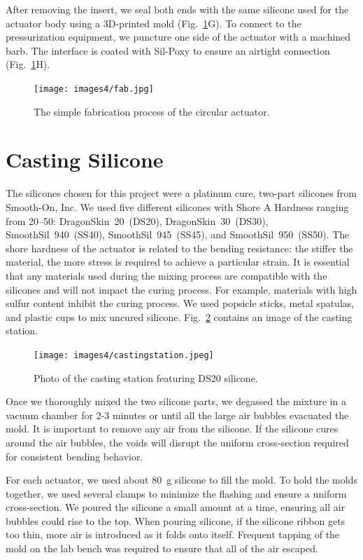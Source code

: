 After removing the insert, we seal both ends with the same silicone used for the actuator body using a 3D-printed mold (Fig.~\ref{figure:fab}G). To connect to the pressurization equipment, we puncture one side of the actuator with a machined barb. The interface is coated with Sil-Poxy to ensure an airtight connection (Fig.~\ref{figure:fab}H).

\begin{figure}[ht!]
    \centering
     \texttt{[image: images4/fab.jpg]}
    \caption{The simple fabrication process of the circular actuator.}
    \label{figure:fab}
\end{figure}

\clearpage
\section{Casting Silicone}

The silicones chosen for this project were a platinum cure, two-part silicones from Smooth-On, Inc. We used five different silicones with Shore A Hardness ranging from 20--50: DragonSkin~20~(DS20), DragonSkin~30~(DS30), SmoothSil~940~(SS40), SmoothSil~945~(SS45), and SmoothSil~950~(SS50). The shore hardness of the actuator is related to the bending resistance: the stiffer the material, the more stress is required to achieve a particular strain. It is essential that any materials used during the mixing process are compatible with the silicones and will not impact the curing process. For example, materials with high sulfur content inhibit the curing process. We used popsicle sticks, metal spatulas, and plastic cups to mix uncured silicone. Fig.~\ref{fig:castingstation} contains an image of the casting station. 

\begin{figure}[ht]
    \centering
    \texttt{[image: images4/castingstation.jpeg]}
    \caption{Photo of the casting station featuring DS20 silicone.}
    \label{fig:castingstation}
\end{figure}

Once we thoroughly mixed the two silicone parts, we degassed the mixture in a vacuum chamber for 2-3 minutes or until all the large air bubbles evacuated the mold. It is important to remove any air from the silicone. If the silicone cures around the air bubbles, the voids will disrupt the uniform cross-section required for consistent bending behavior. 

For each actuator, we used about 80~g silicone to fill the mold. To hold the molds together, we used several clamps to minimize the flashing and ensure a uniform cross-section. We poured the silicone a small amount at a time, ensuring all air bubbles could rise to the top. When pouring silicone, if the silicone ribbon gets too thin, more air is introduced as it folds onto itself. Frequent tapping of the mold on the lab bench was required to ensure that all of the air escaped. 

